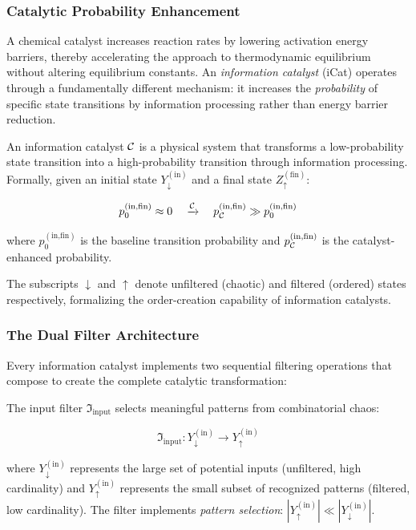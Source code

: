 \subsubsection{Catalytic Probability Enhancement}

A chemical catalyst increases reaction rates by lowering activation energy barriers, thereby accelerating the approach to thermodynamic equilibrium without altering equilibrium constants. An \textit{information catalyst} (iCat) operates through a fundamentally different mechanism: it increases the \textit{probability} of specific state transitions by information processing rather than energy barrier reduction.

\begin{definition}
An information catalyst \(\mathcal{C}\) is a physical system that transforms a low-probability state transition into a high-probability transition through information processing. Formally, given an initial state \(Y_{\downarrow}^{(\text{in})}\) and a final state \(Z_{\uparrow}^{(\text{fin})}\):

\begin{equation}
p_{0}^{(\text{in,fin})} \approx 0 \quad \xrightarrow{\mathcal{C}} \quad p_{\mathcal{C}}^{(\text{in,fin})} \gg p_{0}^{(\text{in,fin})}
\end{equation}

where \(p_{0}^{(\text{in,fin})}\) is the baseline transition probability and \(p_{\mathcal{C}}^{(\text{in,fin})}\) is the catalyst-enhanced probability.
\end{definition}

The subscripts \(\downarrow\) and \(\uparrow\) denote unfiltered (chaotic) and filtered (ordered) states respectively, formalizing the order-creation capability of information catalysts.

\subsubsection{The Dual Filter Architecture}

Every information catalyst implements two sequential filtering operations that compose to create the complete catalytic transformation:

\begin{definition}
The input filter \(\Im_{\text{input}}\) selects meaningful patterns from combinatorial chaos:

\begin{equation}
\Im_{\text{input}}: Y_{\downarrow}^{(\text{in})} \to Y_{\uparrow}^{(\text{in})}
\end{equation}

where \(Y_{\downarrow}^{(\text{in})}\) represents the large set of potential inputs (unfiltered, high cardinality) and \(Y_{\uparrow}^{(\text{in})}\) represents the small subset of recognized patterns (filtered, low cardinality). The filter implements \textit{pattern selection}: \(|Y_{\uparrow}^{(\text{in})}| \ll |Y_{\downarrow}^{(\text{in})}|\).
\end{definition}

